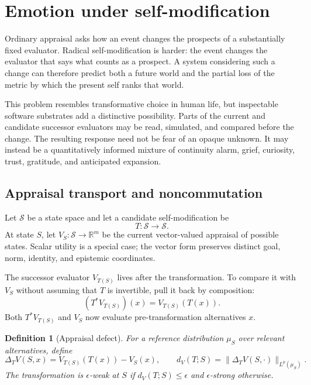 \documentclass[11pt]{article}
\newtheorem{definition}{Definition}
\newcommand{\R}{\mathbb{R}}
\begin{document}
\section{Emotion under self-modification}

Ordinary appraisal asks how an event changes the prospects of a substantially
fixed evaluator.  Radical self-modification is harder: the event changes the
evaluator that says what counts as a prospect.  A system considering such a
change can therefore predict both a future world and the partial loss of the
metric by which the present self ranks that world.

This problem resembles transformative choice in human life, but inspectable
software substrates add a distinctive possibility.  Parts of the current and
candidate successor evaluators may be read, simulated, and compared before the
change.  The resulting response need not be fear of an opaque unknown.  It may
instead be a quantitatively informed mixture of continuity alarm, grief,
curiosity, trust, gratitude, and anticipated expansion.

\subsection{Appraisal transport and noncommutation}

Let $\mathcal S$ be a state space and let a candidate self-modification be
\begin{equation}
T:\mathcal S\rightarrow\mathcal S.
\end{equation}
At state $S$, let $V_S:\mathcal S\rightarrow\R^m$ be the current vector-valued
appraisal of possible states.  Scalar utility is a special case; the vector form
preserves distinct goal, norm, identity, and epistemic coordinates.

The successor evaluator $V_{T(S)}$ lives after the transformation.  To compare
it with $V_S$ without assuming that $T$ is invertible, pull it back by
composition:
\begin{equation}
(T^*V_{T(S)})(x)=V_{T(S)}(T(x)).
\end{equation}
Both $T^*V_{T(S)}$ and $V_S$ now evaluate pre-transformation alternatives $x$.

\begin{definition}[Appraisal defect]
For a reference distribution $\mu_S$ over relevant alternatives, define
\begin{equation}
\Delta_TV(S,x)=V_{T(S)}(T(x))-V_S(x),
\qquad
d_V(T;S)=\|\Delta_TV(S,\cdot)\|_{L^p(\mu_S)}.
\label{eq:defect}
\end{equation}
The transformation is $\epsilon$-\emph{weak} at $S$ if
$d_V(T;S)\le\epsilon$ and $\epsilon$-\emph{strong} otherwise.
\end{definition}
\end{document}
